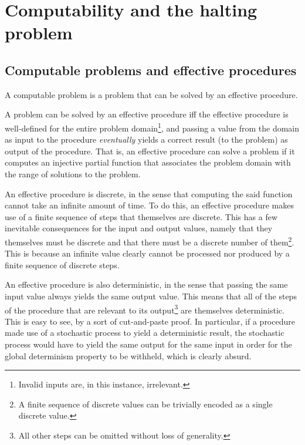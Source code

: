 \chapter{Computability and the halting problem}

\section{Computable problems and effective procedures}

A computable problem is a problem that can be solved by an effective procedure.

A problem can be solved by an effective procedure iff the effective procedure
is well-defined for the entire problem domain\footnote{Invalid inputs are, in
this instance, irrelevant.}, and passing a value from the domain as input to
the procedure \emph{eventually} yields a correct result (to the problem) as
output of the procedure. That is, an effective procedure can solve a problem if
it computes an injective partial function that associates the problem domain
with the range of solutions to the problem.

An effective procedure is discrete, in the sense that computing the said
function cannot take an infinite amount of time. To do this, an effective
procedure makes use of a finite sequence of steps that themselves are discrete.
This has a few inevitable consequences for the input and output values, namely
that they themselves must be discrete and that there must be a discrete number
of them\footnote{A finite sequence of discrete values can be trivially encoded
as a single discrete value.}. This is because an infinite value clearly cannot
be processed nor produced by a finite sequence of discrete steps.

An effective procedure is also deterministic, in the sense that passing the
same input value always yields the same output value. This means that all of
the steps of the procedure that are relevant to its output\footnote{All other
steps can be omitted without loss of generality.} are themselves deterministic.
This is easy to see, by a sort of cut-and-paste proof. In particular, if a
procedure made use of a stochastic process to yield a deterministic result, the
stochastic process would have to yield the same output for the same input in
order for the global determinism property to be withheld, which is clearly
absurd.


